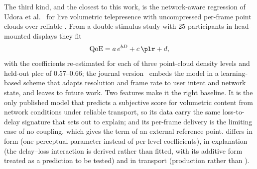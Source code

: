 The third kind, and the closest to this work, is the network-aware
regression of Udora et al.~\cite{qoeholographic,udora2026tmm} for live
volumetric telepresence with uncompressed per-frame point clouds over
reliable . From a double-stimulus study with 25
participants in head-mounted displays they fit
\begin{equation}
  \mathrm{QoE} = a\,e^{b D} + c\,\plr + d,
  \label{eq:udora}
\end{equation}
with the coefficients re-estimated for each of three point-cloud
density levels and held-out \gls{plcc} of 0.57--0.66; the journal
version~\cite{udora2026tmm} embeds the model in a learning-based scheme
that adapts resolution and frame rate to user intent and network
state, and leaves \quic to future work. Two features make it the right
baseline. It is the only published model that predicts a subjective
score for volumetric content from network conditions under reliable
transport, so its data carry the same loss-to-delay signature that
\crystal sets out to explain; and its per-frame delivery is the
limiting case of no \gof coupling, which gives the \gof term of
\crystal an external reference point. \crystal differs in form (one
perceptual parameter instead of per-level coefficients), in
explanation (the delay--loss interaction is derived rather than
fitted, with its additive form treated as a prediction to be tested)
and in transport (production \quic rather than ).
